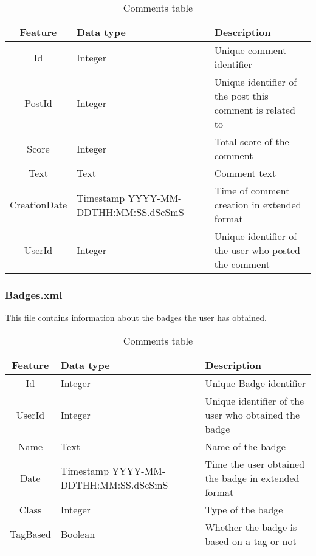 \documentclass[11pt]{article} %
\begin{document}
      \begin{table}[!h]
        \centering
        \begin{tabular}{|c|p{}|p{}|}
          \hline

          Feature & Data type & Description \\ \hline
          Id & Integer & Unique comment identifier \\ \hline
          PostId & Integer & Unique identifier of the post this comment is related to \\ \hline
          Score & Integer & Total score of the comment \\ \hline
          Text & Text & Comment text \\ \hline
          CreationDate & Timestamp YYYY-MM-DDTHH:MM:SS.dScSmS & Time of comment creation in extended format \\ \hline
          UserId & Integer & Unique identifier of the user who posted the comment \\

          \hline
        \end{tabular}
        \caption{Comments table}
        \label{tab:comments}
      \end{table}

    \subsubsection{Badges.xml}

      This file contains information about the badges the user has obtained.

      \begin{table}[!h]
        \centering
        \begin{tabular}{|c|p{}|p{}|}
          \hline

          Feature & Data type & Description \\ \hline
          Id & Integer & Unique Badge identifier \\ \hline
          UserId & Integer & Unique identifier of the user who obtained the badge \\ \hline
          Name & Text & Name of the badge \\ \hline
          Date & Timestamp YYYY-MM-DDTHH:MM:SS.dScSmS & Time the user obtained the badge in extended format \\ \hline
          Class & Integer & Type of the badge \\ \hline
          TagBased & Boolean & Whether the badge is based on a tag or not \\

          \hline
        \end{tabular}
        \caption{Comments table}
        \label{tab:comments}
      \end{table}
\end{document}
